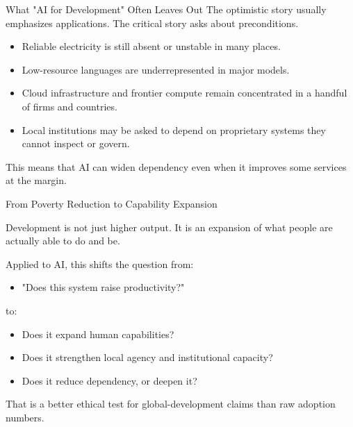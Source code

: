 \documentclass[aspectratio=169,11pt]{beamer}
\begin{document}
\begin{frame}{What "AI for Development" Often Leaves Out}
The optimistic story usually emphasizes applications. The critical story asks about preconditions.

\vspace{0.2cm}
\begin{itemize}
    \item Reliable electricity is still absent or unstable in many places.
    \item Low-resource languages are underrepresented in major models.
    \item Cloud infrastructure and frontier compute remain concentrated in a handful of firms and countries.
    \item Local institutions may be asked to depend on proprietary systems they cannot inspect or govern.
\end{itemize}

\vspace{0.2cm}
This means that AI can widen dependency even when it improves some services at the margin.
\end{frame}

\begin{frame}{From Poverty Reduction to Capability Expansion}
\begin{quotebox}
Development is not just higher output. It is an expansion of what people are actually able to do and be.
\end{quotebox}

\vspace{0.2cm}
Applied to AI, this shifts the question from:
\begin{itemize}
    \item "Does this system raise productivity?"
\end{itemize}

to:
\begin{itemize}
    \item Does it expand human capabilities?
    \item Does it strengthen local agency and institutional capacity?
    \item Does it reduce dependency, or deepen it?
\end{itemize}

\vspace{0.2cm}
That is a better ethical test for global-development claims than raw adoption numbers.
\end{frame}
\end{document}
